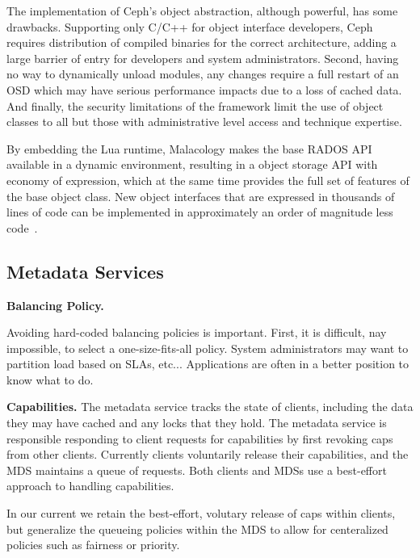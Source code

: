 \documentclass[10pt,twocolumn]{article}
\begin{document}
The implementation of Ceph's object abstraction, although powerful, has some 
drawbacks.
Supporting only C/C++ for object interface developers, Ceph requires
distribution of compiled binaries for the correct architecture, adding a
large barrier of entry for developers and system administrators. Second,
having no way to dynamically unload modules, any changes require a full
restart of an OSD which may have serious performance impacts due to a loss
of cached data. And finally, the security limitations of the framework
limit the use of object classes to all but those with administrative level
access and technique expertise.

By embedding the Lua runtime, Malacology makes the base RADOS API available in a 
dynamic environment, resulting in a object storage API with economy of 
expression, which at the same time provides the full set of features of the base 
object class. New object interfaces that are expressed in thousands of lines of 
code can be implemented in approximately an order of magnitude less 
code~\cite{geambasu_comet_2010}.


\subsection{Metadata Services}

%

{\bf Balancing Policy.}

Avoiding hard-coded balancing policies is important. First, it is difficult,
nay impossible, to select a one-size-fits-all policy. System administrators
may want to partition load based on SLAs, etc... Applications are often in
a better position to know what to do.

{\bf Capabilities.}
The metadata service tracks the state of clients, including the data they
may have cached and any locks that they hold. The metadata service is
responsible responding to client requests for capabilities by first
revoking caps from other clients. Currently clients voluntarily
release their capabilities, and the MDS maintains a queue of requests.
Both clients and MDSs use a best-effort approach to handling capabilities.

In our current we retain the best-effort, volutary release of caps within
clients, but generalize the queueing policies within the MDS to allow for
centeralized policies such as fairness or priority.
\end{document}
